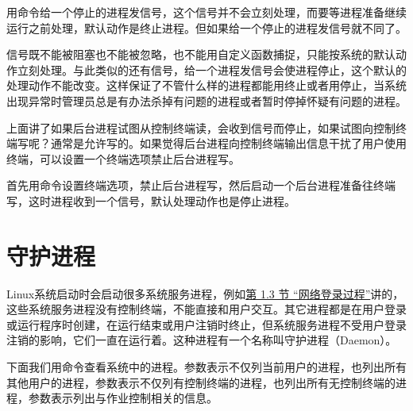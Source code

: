 

用命令给一个停止的进程发信号，这个信号并不会立刻处理，而要等进程准备继续运行之前处理，默认动作是终止进程。但如果给一个停止的进程发信号就不同了。




信号既不能被阻塞也不能被忽略，也不能用自定义函数捕捉，只能按系统的默认动作立刻处理。与此类似的还有信号，给一个进程发信号会使进程停止，这个默认的处理动作不能改变。这样保证了不管什么样的进程都能用终止或者用停止，当系统出现异常时管理员总是有办法杀掉有问题的进程或者暂时停掉怀疑有问题的进程。



上面讲了如果后台进程试图从控制终端读，会收到信号而停止，如果试图向控制终端写呢？通常是允许写的。如果觉得后台进程向控制终端输出信息干扰了用户使用终端，可以设置一个终端选项禁止后台进程写。




首先用命令设置终端选项，禁止后台进程写，然后启动一个后台进程准备往终端写，这时进程收到一个信号，默认处理动作也是停止进程。




\section{守护进程}
%
Linux系统启动时会启动很多系统服务进程，例如\hyperlink{db.ch34s01.id2891618}{第 1.\BookSplit{}3 节 “网络登录过程”}讲的，这些系统服务进程没有控制终端，不能直接和用户交互。其它进程都是在用户登录或运行程序时创建，在运行结束或用户注销时终止，但系统服务进程不受用户登录注销的影响，它们一直在运行着。这种进程有一个名称叫守护进程（Daemon）。



下面我们用命令查看系统中的进程。参数表示不仅列当前用户的进程，也列出所有其他用户的进程，参数表示不仅列有控制终端的进程，也列出所有无控制终端的进程，参数表示列出与作业控制相关的信息。



